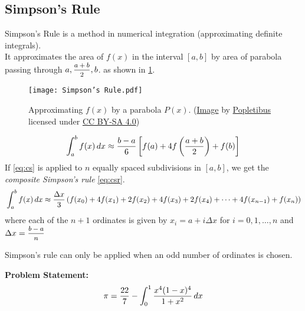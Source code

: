\subsection{Simpson's Rule}{\label{pp:simpsonsrule}}
{\small%
Simpson's Rule is a method in numerical integration (approximating definite integrals).\\
It approximates the area of $f(x)$ in the interval $[a,b]$ by area of parabola passing through $a, \mfrac{a+b}{2}, b$. as shown in \ref{fig:simpsonsrule}.%
\begin{figure}[H]
\centering
\texttt{[image: Simpson's Rule.pdf]}
\caption{Approximating $f(x)$ by a parabola $P(x)$. (\href{https://bit.ly/simpsons-rule}{Image} by \href{https://commons.wikimedia.org/wiki/User:Popletibus}{Popletibus} licensed under \href{https://creativecommons.org/licenses/by-sa/4.0/}{CC BY-SA 4.0})}
\label{fig:simpsonsrule}
\end{figure}
\begin{equation}{\label{eq:cs}}
{ \int _{a}^{b}f(x)\,dx\approx {\frac {b-a}{6}}\left[f(a)+4f\left({\frac {a+b}{2}}\right)+f(b)\right]}
\end{equation}
If \ref{eq:cs} is applied to $n$ equally spaced subdivisions in $[a, b]$, we get the \emph{composite Simpson's rule} \ref{eq:csr}.
\begin{equation}{\label{eq:csr}}
	 \int _{a}^{b}f(x)\,dx\approx {\frac {\Delta x}{3}}\left(f(x_{0})+4f(x_{1})+2f(x_{2})+4f(x_{3})+2f(x_{4})+\cdots +4f(x_{n-1})+f(x_{n})\right)
\end{equation}
where each of the $n+1$ ordinates is given by $x_i = a+i\Delta x$ for $i = 0,1,\ldots,n$ and $\Delta x = \mfrac{b-a}{n}$
\begin{note}
	Simpson's rule can only be applied when an odd number of ordinates is chosen.
\end{note}
\textbf{Problem Statement:}\\
\begin{equation}{\label{eq:pi_integral}}
{ \pi={22 \over 7} - \int _{0}^{1}{x^{4}(1-x)^{4} \over 1+x^{2}}\,dx } 
\end{equation}
}
